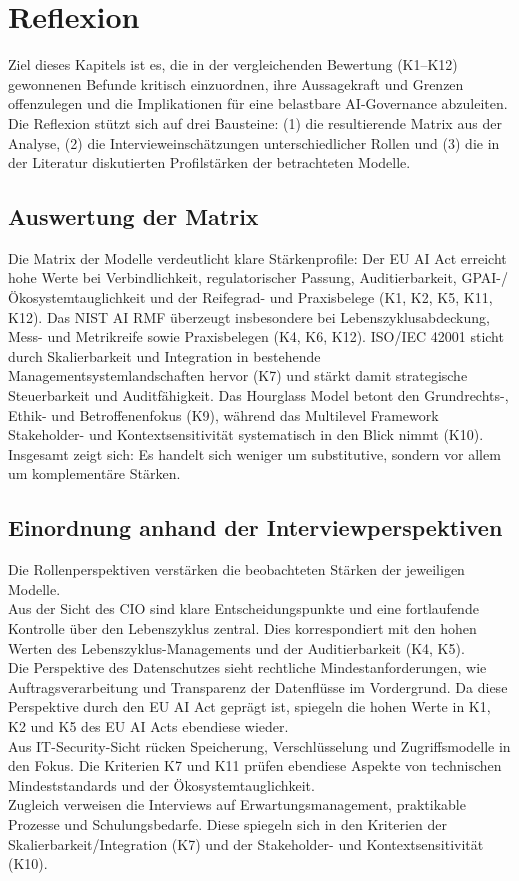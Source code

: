\newpage
\section{Reflexion}
\label{sec:reflexion}
Ziel dieses Kapitels ist es, die in der vergleichenden Bewertung (K1–K12) gewonnenen Befunde kritisch einzuordnen, ihre Aussagekraft und Grenzen offenzulegen und die Implikationen für eine belastbare AI-Governance abzuleiten.
Die Reflexion stützt sich auf drei Bausteine: (1) die resultierende Matrix aus der Analyse, (2) die Intervieweinschätzungen unterschiedlicher Rollen und (3) die in der Literatur diskutierten Profilstärken der betrachteten Modelle.

\subsection{Auswertung der Matrix}
Die Matrix der Modelle verdeutlicht klare Stärkenprofile:
Der EU AI Act erreicht hohe Werte bei Verbindlichkeit, regulatorischer Passung, Auditierbarkeit, GPAI-/Ökosystemtauglichkeit und der Reifegrad- und Praxisbelege (K1, K2, K5, K11, K12).
Das NIST AI RMF überzeugt insbesondere bei Lebenszyklusabdeckung, Mess- und Metrikreife sowie Praxisbelegen (K4, K6, K12).
ISO/IEC 42001 sticht durch Skalierbarkeit und Integration in bestehende Managementsystemlandschaften hervor (K7) und stärkt damit strategische Steuerbarkeit und Auditfähigkeit.
Das Hourglass Model betont den Grundrechts-, Ethik- und Betroffenenfokus (K9), während das Multilevel Framework Stakeholder- und Kontextsensitivität systematisch in den Blick nimmt (K10).
Insgesamt zeigt sich: Es handelt sich weniger um substitutive, sondern vor allem um komplementäre Stärken.

\subsection{Einordnung anhand der Interviewperspektiven}
Die Rollenperspektiven verstärken die beobachteten Stärken der jeweiligen Modelle.
\\
Aus der Sicht des CIO sind klare Entscheidungspunkte und eine fortlaufende Kontrolle über den Lebenszyklus zentral.
Dies korrespondiert mit den hohen Werten des Lebenszyklus-Managements und der Auditierbarkeit (K4, K5).
\\
Die Perspektive des Datenschutzes sieht rechtliche Mindestanforderungen, wie Auftragsverarbeitung und Transparenz der Datenflüsse im Vordergrund.
Da diese Perspektive durch den EU AI Act geprägt ist, spiegeln die hohen Werte in K1, K2 und K5 des EU AI Acts ebendiese wieder.
\\
Aus IT-Security-Sicht rücken Speicherung, Verschlüsselung und Zugriffsmodelle in den Fokus.
Die Kriterien K7 und K11 prüfen ebendiese Aspekte von technischen Mindeststandards und der Ökosystemtauglichkeit.
\\
Zugleich verweisen die Interviews auf Erwartungsmanagement, praktikable Prozesse und Schulungsbedarfe.
Diese spiegeln sich in den Kriterien der Skalierbarkeit/Integration (K7) und der Stakeholder- und Kontextsensitivität (K10).

